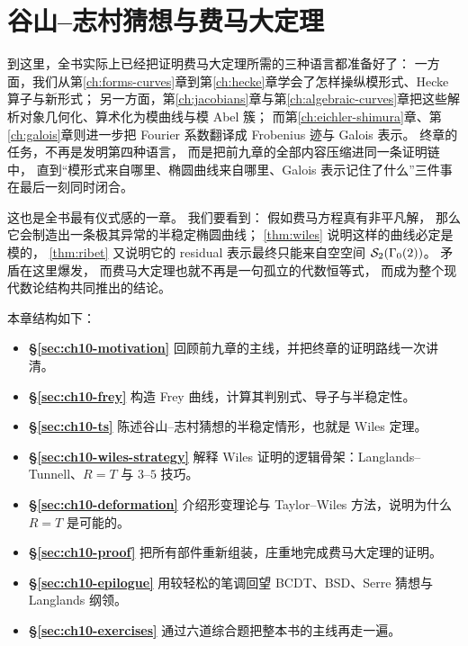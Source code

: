 \chapter{谷山--志村猜想与费马大定理}
\label{ch:flt}

到这里，全书实际上已经把证明费马大定理所需的三种语言都准备好了：
一方面，我们从第\ref{ch:forms-curves}章到第\ref{ch:hecke}章学会了怎样操纵模形式、Hecke 算子与新形式；
另一方面，第\ref{ch:jacobians}章与第\ref{ch:algebraic-curves}章把这些解析对象几何化、算术化为模曲线与模 Abel 簇；
而第\ref{ch:eichler-shimura}章、第\ref{ch:galois}章则进一步把 Fourier 系数翻译成 Frobenius 迹与 Galois 表示。
终章的任务，不再是发明第四种语言，
而是把前九章的全部内容压缩进同一条证明链中，
直到“模形式来自哪里、椭圆曲线来自哪里、Galois 表示记住了什么”三件事在最后一刻同时闭合。

这也是全书最有仪式感的一章。
我们要看到：
假如费马方程真有非平凡解，
那么它会制造出一条极其异常的半稳定椭圆曲线；
\cref{thm:wiles} 说明这样的曲线必定是模的，
\cref{thm:ribet} 又说明它的 residual 表示最终只能来自空空间 $\mathcal{S}_2(\Gamma_0(2))$。
矛盾在这里爆发，
而费马大定理也就不再是一句孤立的代数恒等式，
而成为整个现代数论结构共同推出的结论。

本章结构如下：
\begin{itemize}
  \item \textbf{§\ref{sec:ch10-motivation}} 回顾前九章的主线，并把终章的证明路线一次讲清。
  \item \textbf{§\ref{sec:ch10-frey}} 构造 Frey 曲线，计算其判别式、导子与半稳定性。
  \item \textbf{§\ref{sec:ch10-ts}} 陈述谷山--志村猜想的半稳定情形，也就是 Wiles 定理。
  \item \textbf{§\ref{sec:ch10-wiles-strategy}} 解释 Wiles 证明的逻辑骨架：Langlands--Tunnell、$R=T$ 与 $3$--$5$ 技巧。
  \item \textbf{§\ref{sec:ch10-deformation}} 介绍形变理论与 Taylor--Wiles 方法，说明为什么 $R=T$ 是可能的。
  \item \textbf{§\ref{sec:ch10-proof}} 把所有部件重新组装，庄重地完成费马大定理的证明。
  \item \textbf{§\ref{sec:ch10-epilogue}} 用较轻松的笔调回望 BCDT、BSD、Serre 猜想与 Langlands 纲领。
  \item \textbf{§\ref{sec:ch10-exercises}} 通过六道综合题把整本书的主线再走一遍。
\end{itemize}









